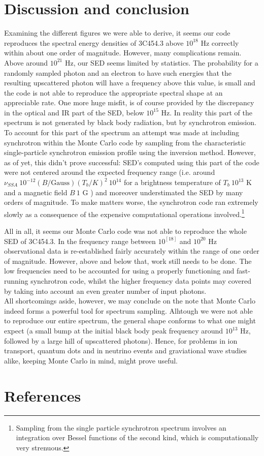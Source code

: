 \documentclass{article}
\begin{document}
\section{Discussion and conclusion}
    Examining the different figures we were able to derive, it seems our code reproduces the spectral energy densities of 3C454.3 above $10^{18}$ Hz correctly within about one order of magnitude. However, many complications remain. Above around $10^{21}$ Hz, our SED seems limited by statistics. The probability for a randomly sampled photon and an electron to have such energies that the resulting upscattered photon will have a frequency above this value, is small and the code is not able to reproduce the appropriate spectral shape at an appreciable rate. One more huge misfit, is of course provided by the discrepancy in the optical and IR part of the SED, below $10^{15}$ Hz. In reality this part of the spectrum is not generated by black body radiation, but by synchrotron emission. To account for this part of the spectrum an attempt was made at including synchrotron within the Monte Carlo code by sampling from the characteristic single-particle synchrotron emission profile using the inversion method. However, as of yet, this didn't prove successful: SED's computed using this part of the code were not centered around the expected frequency range (i.e. around $\nu_{SSA} ~ 10^{-12} (B/\mathrm{Gauss}) (T_b / K)^2 ~ 10^{14}$ for a brightness temperature of $T_b ~ 10^{13}$ K \cite{Terasranta1994} and a magnetic field $B ~ 1$ G \cite{Gupta2017}) and moreover understimated the SED by many orders of magnitude. To make matters worse, the synchrotron code ran extremely slowly as a consequence of the expensive computational operations involved.\footnote{Sampling from the single particle synchrotron spectrum involves an integration over Bessel functions of the second kind, which is computationally very strenuous.} \\

    \par All in all, it seems our Monte Carlo code was not able to reproduce the whole SED of 3C454.3. In the frequency range between $10^[18]$ and $10^{20}$ Hz observational data is re-established fairly accurately within the range of one order of magnitude. However, above and below that, work still needs to be done. The low frequencies need to be accounted for using a properly functioning and fast-running synchrotron code, whilst the higher frequency data points may covered by taking into account an even greater number of input photons. \\
    All shortcomings aside, however, we may conclude on the note that Monte Carlo indeed forms a powerful tool for spectrum sampling. Alhtough we were not able to reproduce our entire spectrum, the general shape conforms to what one might expect (a small bump at the initial black body peak frequency around $10^13$ Hz, followed by a large hill of upscattered photons). Hence, for problems in ion transport, quantum dots and in neutrino events and graviational wave studies alike, keeping Monte Carlo in mind, might prove useful.
    



\clearpage
\section{References}
\renewcommand\refname{}


\end{document}
